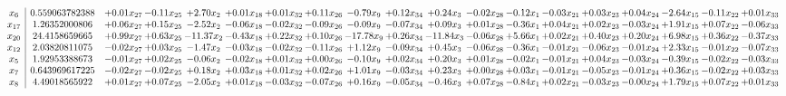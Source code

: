 \documentclass[9pt]{article}
\begin{document}
 \[\begin{array}{c| c c@{\hskip 2pt} c@{\hskip 2pt} c@{\hskip 2pt} c@{\hskip 2pt} c@{\hskip 2pt} c@{\hskip 2pt} c@{\hskip 2pt} c@{\hskip 2pt} c@{\hskip 2pt} c@{\hskip 2pt} c@{\hskip 2pt} c@{\hskip 2pt} c@{\hskip 2pt} c@{\hskip 2pt} c@{\hskip 2pt} c@{\hskip 2pt} c@{\hskip 2pt} }
 x_{6}   &  0.559063782388 & +  0.01 x_{27} & -0.11 x_{25} & +  2.70 x_{2} & +  0.01 x_{18} & +  0.01 x_{32} & +  0.11 x_{26} & -0.79 x_{9} & +  0.12 x_{34} & +  0.24 x_{3} & -0.02 x_{28} & -0.12 x_{1} & -0.03 x_{21} & +  0.03 x_{23} & +  0.04 x_{24} & -2.64 x_{15} & -0.11 x_{22} & +  0.01 x_{33}\\
 x_{17}   &  1.26352000806 & +  0.06 x_{27} & +  0.15 x_{25} & -2.52 x_{2} & -0.06 x_{18} & -0.02 x_{32} & -0.09 x_{26} & -0.09 x_{9} & -0.07 x_{34} & +  0.09 x_{3} & +  0.01 x_{28} & -0.36 x_{1} & +  0.04 x_{21} & +  0.02 x_{23} & -0.03 x_{24} & +  1.91 x_{15} & +  0.07 x_{22} & -0.06 x_{33}\\
 x_{20}   &  24.4158659665 & +  0.99 x_{27} & +  0.63 x_{25} & -11.37 x_{2} & -0.43 x_{18} & +  0.22 x_{32} & +  0.10 x_{26} & -17.78 x_{9} & +  0.26 x_{34} & -11.84 x_{3} & -0.06 x_{28} & +  5.66 x_{1} & +  0.02 x_{21} & +  0.40 x_{23} & +  0.20 x_{24} & +  6.98 x_{15} & +  0.36 x_{22} & -0.37 x_{33}\\
 x_{12}   &  2.03820811075 & -0.02 x_{27} & +  0.03 x_{25} & -1.47 x_{2} & -0.03 x_{18} & -0.02 x_{32} & -0.11 x_{26} & +  1.12 x_{9} & -0.09 x_{34} & +  0.45 x_{3} & -0.06 x_{28} & -0.36 x_{1} & -0.01 x_{21} & -0.06 x_{23} & -0.01 x_{24} & +  2.33 x_{15} & -0.01 x_{22} & -0.07 x_{33}\\
 x_{5}   &  1.92953388673 & -0.01 x_{27} & +  0.02 x_{25} & -0.06 x_{2} & -0.02 x_{18} & +  0.01 x_{32} & +  0.00 x_{26} & -0.10 x_{9} & +  0.02 x_{34} & +  0.20 x_{3} & +  0.01 x_{28} & -0.02 x_{1} & -0.01 x_{21} & +  0.04 x_{23} & -0.03 x_{24} & -0.39 x_{15} & -0.02 x_{22} & -0.03 x_{33}\\
 x_{7}   &  0.643969617225 & -0.02 x_{27} & -0.02 x_{25} & +  0.18 x_{2} & +  0.03 x_{18} & +  0.01 x_{32} & +  0.02 x_{26} & +  1.01 x_{9} & -0.03 x_{34} & +  0.23 x_{3} & +  0.00 x_{28} & +  0.03 x_{1} & -0.01 x_{21} & -0.05 x_{23} & -0.01 x_{24} & +  0.36 x_{15} & -0.02 x_{22} & +  0.03 x_{33}\\
 x_{8}   &  4.49018565922 & +  0.01 x_{27} & +  0.07 x_{25} & -2.05 x_{2} & +  0.01 x_{18} & -0.03 x_{32} & -0.07 x_{26} & +  0.16 x_{9} & -0.05 x_{34} & -0.46 x_{3} & +  0.07 x_{28} & -0.84 x_{1} & +  0.02 x_{21} & -0.03 x_{23} & -0.00 x_{24} & +  1.79 x_{15} & +  0.07 x_{22} & +  0.01 x_{33}\\

\end{array}\]
\end{document}
